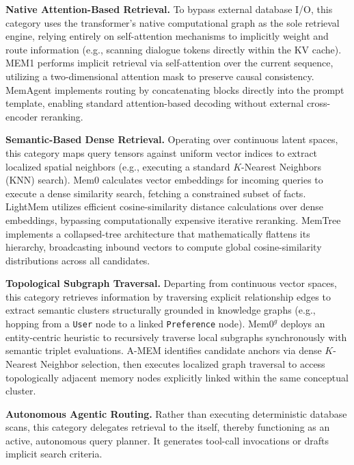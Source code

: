 \noindent {} \textbf{Native Attention-Based Retrieval.}
To bypass external database I/O, this category uses the transformer's native computational graph as the sole retrieval engine, relying entirely on self-attention mechanisms to implicitly weight and route information (e.g., scanning dialogue tokens directly within the KV cache). MEM1 performs implicit retrieval via self-attention over the current sequence, utilizing a two-dimensional attention mask to preserve causal consistency. MemAgent implements routing by concatenating blocks directly into the prompt template, enabling standard attention-based decoding without external cross-encoder reranking.

\noindent {} \textbf{Semantic-Based Dense Retrieval.}
Operating over continuous latent spaces, this category maps query tensors against uniform vector indices to extract localized spatial neighbors (e.g., executing a standard $K$-Nearest Neighbors (KNN) search). Mem0 calculates vector embeddings for incoming queries to execute a dense similarity search, fetching a constrained subset of facts. LightMem utilizes efficient cosine-similarity distance calculations over dense embeddings, bypassing computationally expensive iterative reranking. MemTree implements a collapsed-tree architecture that mathematically flattens its hierarchy, broadcasting inbound vectors to compute global cosine-similarity distributions across all candidates.


\noindent {} \textbf{Topological Subgraph Traversal.}
Departing from continuous vector spaces, this category retrieves information by traversing explicit relationship edges to extract semantic clusters structurally grounded in knowledge graphs (e.g., hopping from a \texttt{User} node to a linked \texttt{Preference} node).
$\text{Mem0}^g$ deploys an entity-centric heuristic to recursively traverse local subgraphs synchronously with semantic triplet evaluations.
A-MEM identifies candidate anchors via dense $K$-Nearest Neighbor selection, then executes localized graph traversal to access topologically adjacent memory nodes explicitly linked within the same conceptual cluster.

\noindent {} \textbf{Autonomous Agentic Routing.}
Rather than executing deterministic database scans, this category delegates retrieval to the \llm itself, thereby functioning as an active, autonomous query planner. It generates tool-call invocations or drafts implicit search criteria.

